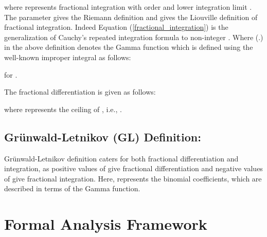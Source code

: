 \documentclass {llncs}
\begin{document}
\noindent where  represents  fractional integration with order   and  lower integration limit . The parameter  gives the Riemann definition and
  gives the Liouville definition of fractional integration. Indeed Equation (\ref{fractional_integration})
 is the generalization  of Cauchy's repeated integration formula to non-integer  \cite{BROSS_75}.
 Where   (.) in the above definition denotes the Gamma function which is defined using the well-known improper integral as follows:

\noindent for .


The fractional differentiation is given as follows:


  



\noindent where  represents the ceiling of , i.e., .


 \subsection*{\textbf{Gr\"{u}nwald-Letnikov (GL) Definition:}}




\noindent Gr\"{u}nwald-Letnikov definition  caters for both  fractional differentiation and integration, as positive values of  give fractional differentiation and negative values of  give fractional integration. Here,  represents the binomial coefficients, which are described in terms of the Gamma function.













\section{Formal Analysis Framework} \label{sec:formal_analysis}
\end{document}
